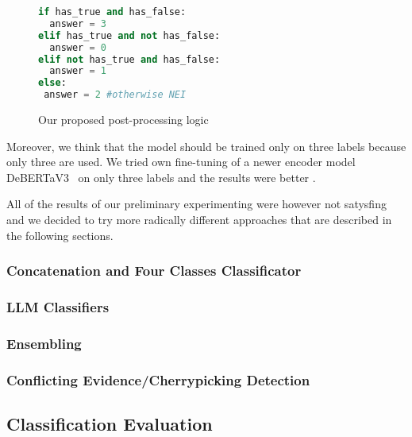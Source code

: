 \begin{figure}
    \begin{lstlisting}[language=Python]
if has_true and has_false:
  answer = 3
elif has_true and not has_false:
  answer = 0
elif not has_true and has_false:
  answer = 1
else:
 answer = 2 #otherwise NEI
        \end{lstlisting}
    \caption{Our proposed post-processing logic} 
    \label{lst:post-processing}       
\end{figure}

Moreover, we think that the model should be trained only on three labels because only three are used. We tried own fine-tuning of a newer encoder model DeBERTaV3~\cite{he2023debertav3improvingdebertausing} on only three labels and the results were better .

All of the results of our preliminary experimenting were however not satysfing and we decided to try more radically different approaches that are described in the following sections.

\subsubsection*{Concatenation and Four Classes Classificator}

\subsubsection*{LLM Classifiers}

\subsubsection*{Ensembling}

\subsubsection*{Conflicting Evidence/Cherrypicking Detection}


\subsection{Classification Evaluation}
